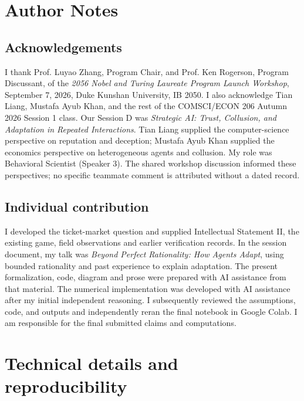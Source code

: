 \clearpage
\section*{Author Notes}
\subsection*{Acknowledgements}
I thank Prof. Luyao Zhang, Program Chair, and Prof. Ken Rogerson, Program Discussant, of the \emph{2056 Nobel and Turing Laureate Program Launch Workshop}, September 7, 2026, Duke Kunshan University, IB 2050. I also acknowledge Tian Liang, Mustafa Ayub Khan, and the rest of the COMSCI/ECON 206 Autumn 2026 Session 1 class. Our Session D was \emph{Strategic AI: Trust, Collusion, and Adaptation in Repeated Interactions}. Tian Liang supplied the computer-science perspective on reputation and deception; Mustafa Ayub Khan supplied the economics perspective on heterogeneous agents and collusion. My role was Behavioral Scientist (Speaker 3). The shared workshop discussion informed these perspectives; no specific teammate comment is attributed without a dated record.
\subsection*{Individual contribution}
I developed the ticket-market question and supplied Intellectual Statement II, the existing game, field observations and earlier verification records. In the session document, my talk was \emph{Beyond Perfect Rationality: How Agents Adapt}, using bounded rationality and past experience to explain adaptation. The present formalization, code, diagram and prose were prepared with AI assistance from that material. The numerical implementation was developed with AI assistance after my initial independent reasoning. I subsequently reviewed the assumptions, code, and outputs and independently reran the final notebook in Google Colab. I am responsible for the final submitted claims and computations.


\appendix
\section{Technical details and reproducibility}
